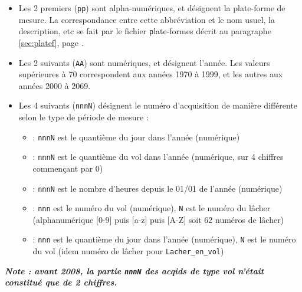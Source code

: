 \medbreak
\begin{itemize}
  \item Les 2 premiers (\texttt{pp}) sont alpha-numériques, et désignent la 
   plate-forme de mesure. La correspondance entre cette abbréviation et
   le nom usuel, la description, etc se fait par le fichier
   {\texttt plate-formes} décrit au paragraphe \ref{sec:platef}, page 
   \pageref{sec:platef}.

  \medbreak
  \item Les 2 suivants (\texttt{AA}) sont numériques, et désignent l'année.
   Les valeurs supérieures à 70 correspondent aux années 1970 à 1999,
   et les autres aux années 2000 à 2069.

  \medbreak
  \item Les 4 suivants (\texttt{nnnN}) désignent le
   numéro d'acquisition de manière différente selon le type de période de
   mesure :

   \begin{itemize}

     \item[\textbf{Journee}] : \texttt{nnnN} est le quantième du jour dans
                               l'année (numérique)

     \item[\textbf{Vol}] : \texttt{nnnN} est le quantième du vol dans l'année
                           (numérique, sur 4 chiffres commençant par 0)

     \item[\textbf{Lacher}] : \texttt{nnnN} est le nombre d'heures depuis le 01/01
                              de l'année (numérique)

     \item[\textbf{Lacher\_en\_vol}] : \texttt{nnn} est le numéro du vol (numérique),
                                       \texttt{N} est le numéro du lâcher
                                       (alphanumérique [0-9] puis [a-z] puis [A-Z]
                                       soit 62 numéros de lâcher)

     \item[\textbf{Drone}] : \texttt{nnn} est le quantième du jour dans l'année
                             (numérique), \texttt{N} est le numéro du vol (idem
                             numéro de lâcher pour \texttt{Lacher\_en\_vol})
   \end{itemize}
\end{itemize}

\textbf{\textit{Note : avant 2008, la partie \texttt{nnnN} des acqids de type
vol n'était constitué que de 2 chiffres.}}


